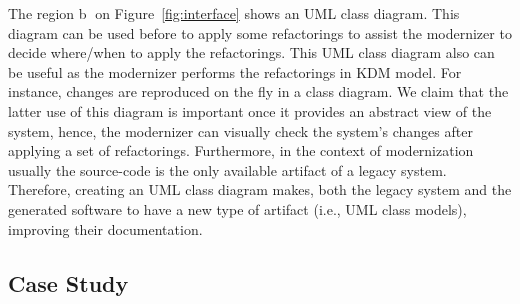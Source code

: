 \documentclass[12pt]{article}
\begin{document}
The region \textcircled{b} on Figure~\ref{fig:interface} shows an UML class diagram. This diagram can be used before to apply some refactorings to assist the modernizer to decide where/when to apply the refactorings. This UML class diagram also can be useful as the modernizer performs the refactorings in KDM model. For instance, changes are reproduced on the fly in a class diagram.
We claim that the latter use of this diagram is important once it provides an abstract view of the system, hence, the modernizer can visually check the system's changes after applying a set of refactorings. 
Furthermore, in the context of modernization usually the source-code is the only available artifact of a legacy system. 
Therefore, creating an UML class diagram makes, both the legacy system and the generated software to have a new type of artifact (i.e., UML class models), improving their documentation.


\subsection{Case Study}
\end{document}
